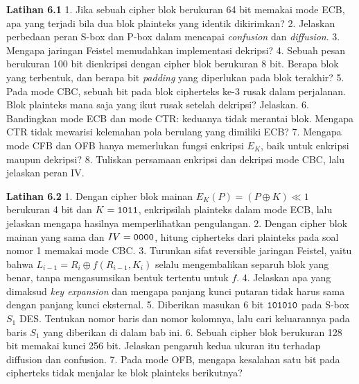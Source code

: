 
\begin{obereflection}
\textbf{Latihan 6.1}
1. Jika sebuah cipher blok berukuran 64 bit memakai mode ECB, apa yang terjadi
   bila dua blok plainteks yang identik dikirimkan?
2. Jelaskan perbedaan peran S-box dan P-box dalam mencapai \textit{confusion}
   dan \textit{diffusion}.
3. Mengapa jaringan Feistel memudahkan implementasi dekripsi?
4. Sebuah pesan berukuran 100 bit dienkripsi dengan cipher blok berukuran
   8 bit. Berapa blok yang terbentuk, dan berapa bit \textit{padding} yang
   diperlukan pada blok terakhir?
5. Pada mode CBC, sebuah bit pada blok cipherteks ke-3 rusak dalam perjalanan.
   Blok plainteks mana saja yang ikut rusak setelah dekripsi? Jelaskan.
6. Bandingkan mode ECB dan mode CTR: keduanya tidak merantai blok. Mengapa CTR
   tidak mewarisi kelemahan pola berulang yang dimiliki ECB?
7. Mengapa mode CFB dan OFB hanya memerlukan fungsi enkripsi $E_K$, baik untuk
   enkripsi maupun dekripsi?
8. Tuliskan persamaan enkripsi dan dekripsi mode CBC, lalu jelaskan peran IV.
\end{obereflection}

\begin{obereflection}
\textbf{Latihan 6.2}
1. Dengan cipher blok mainan $E_K(P)=(P\oplus K)\ll 1$ berukuran 4 bit dan
   $K=\texttt{1011}$, enkripsilah plainteks  dalam mode ECB, lalu
   jelaskan mengapa hasilnya memperlihatkan pengulangan.
2. Dengan cipher blok mainan yang sama dan $IV=\texttt{0000}$, hitung cipherteks
   dari plainteks pada soal nomor 1 memakai mode CBC.
3. Turunkan sifat reversible jaringan Feistel, yaitu bahwa
   $L_{i-1}=R_i\oplus f(R_{i-1},K_i)$ selalu mengembalikan separuh blok yang
   benar, tanpa mengasumsikan bentuk tertentu untuk $f$.
4. Jelaskan apa yang dimaksud \textit{key expansion} dan mengapa panjang kunci
   putaran tidak harus sama dengan panjang kunci eksternal.
5. Diberikan masukan 6 bit $\texttt{101010}$ pada S-box $S_1$ DES. Tentukan nomor
   baris dan nomor kolomnya, lalu cari keluarannya pada baris $S_1$ yang
   diberikan di dalam bab ini.
6. Sebuah cipher blok berukuran 128 bit memakai kunci 256 bit. Jelaskan
   pengaruh kedua ukuran itu terhadap diffusion dan confusion.
7. Pada mode OFB, mengapa kesalahan satu bit pada cipherteks tidak menjalar ke
   blok plainteks berikutnya?
\end{obereflection}

